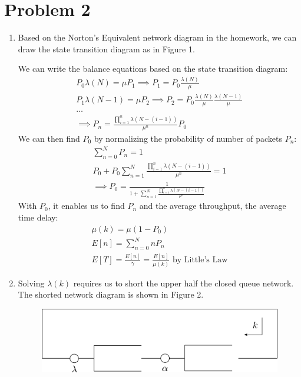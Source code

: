 \documentclass{article}
\begin{document}
\section*{Problem 2}
	\begin{enumerate}
		\item Based on the Norton's Equivalent network diagram in the homework, we
			can draw the state transition diagram as in Figure 1.
			\vspace{40mm}

			We can write the balance equations based on the state transition diagram:
			\begin{gather*}
				P_{0} \lambda(N) = \mu P_{1} \implies P_{1} = P_{0} \frac{\lambda(N)}{\mu} \\
				P_{1} \lambda(N-1) = \mu P_{2} \implies P_{2} = P_{0} \frac{\lambda(N)}{\mu} \frac{\lambda(N-1)}{\mu} \\
				\ldots \\
				\implies P_{n} = \frac{\prod\limits_{i=1}^{n} \lambda(N-(i-1))}{\mu^{n}} P_{0}
			\end{gather*}
			We can then find $P_{0}$ by normalizing the probability of number of
			packets $P_{n}$:
			\begin{gather*}
				\sum\limits_{n=0}^{N} P_{n} = 1 \\
				P_{0} + P_{0} \sum\limits_{n=1}^{N} \frac{\prod\limits_{i=1}^{n} \lambda(N-(i-1))}{\mu^{n}} = 1 \\
				\implies P_{0} = \frac{1}{1 + \sum\limits_{n=1}^{N} \frac{\prod\limits_{i=1}^{n} \lambda(N-(i-1))}{\mu^{n}}}
			\end{gather*}
			With $P_{0}$, it enables us to find $P_{n}$ and the average throughput,
			the average time delay:
			\begin{gather*}
				\mu(k) = \mu(1 - P_{0}) \\
				E[n] = \sum\limits_{n=0}^{N} nP_{n} \\
				E[T] = \frac{E[n]}{\gamma} = \frac{E[n]}{\mu(k)} \text{ by Little's Law}
			\end{gather*}
		\item Solving $\lambda(k)$ requires us to short the upper half the closed
			queue network. The shorted network diagram is shown in Figure 2.
			\begin{figure}[!hbt]
				\centering
				\includegraphics[width=0.8\linewidth]{hw6_2_norton.png}
			\end{figure}


\end{enumerate}
\end{document}
